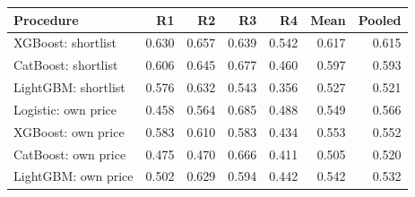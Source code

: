 \begin{center}\small
\begin{tabular}{@{}lrrrrrr@{}}\toprule
Procedure & R1 & R2 & R3 & R4 & Mean & Pooled\\\midrule
XGBoost: shortlist & 0.630 & 0.657 & 0.639 & 0.542 & 0.617 & 0.615\\
CatBoost: shortlist & 0.606 & 0.645 & 0.677 & 0.460 & 0.597 & 0.593\\
LightGBM: shortlist & 0.576 & 0.632 & 0.543 & 0.356 & 0.527 & 0.521\\
Logistic: own price & 0.458 & 0.564 & 0.685 & 0.488 & 0.549 & 0.566\\
XGBoost: own price & 0.583 & 0.610 & 0.583 & 0.434 & 0.553 & 0.552\\
CatBoost: own price & 0.475 & 0.470 & 0.666 & 0.411 & 0.505 & 0.520\\
LightGBM: own price & 0.502 & 0.629 & 0.594 & 0.442 & 0.542 & 0.532\\
\bottomrule\end{tabular}\end{center}
